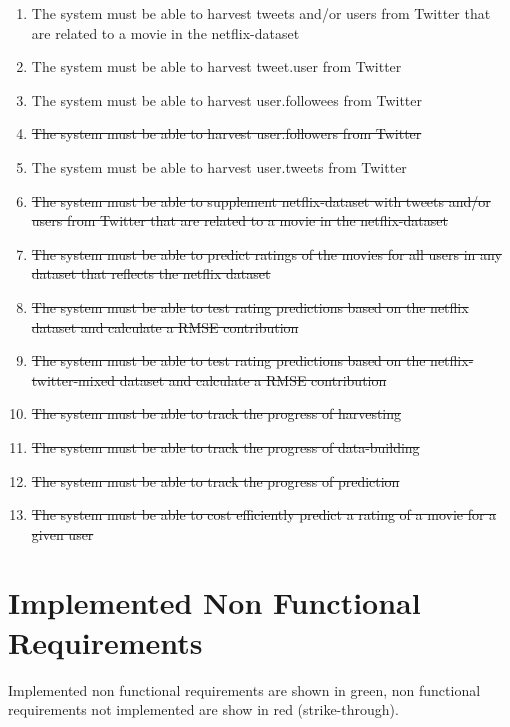 \begin{enumerate}[label=\bfseries FR \arabic*:]
  \item {\color{OliveGreen}The system must be able to harvest tweets and/or users from Twitter that are related to a movie in the netflix-dataset}
  \item {\color{OliveGreen}The system must be able to harvest tweet.user from Twitter}
  \item {\color{OliveGreen}The system must be able to harvest user.followees from Twitter}
  \item {\color{RedOrange}\st{The system must be able to harvest user.followers from Twitter}}
  \item {\color{OliveGreen}The system must be able to harvest user.tweets from Twitter}
  \item {\color{RedOrange}\st{The system must be able to supplement netflix-dataset with tweets and/or users from Twitter that are related to a movie in the netflix-dataset}}
  \item {\color{RedOrange}\st{The system must be able to predict ratings of the movies for all users in any dataset that reflects the netflix dataset}}
  \item {\color{RedOrange}\st{The system must be able to test rating predictions based on the netflix dataset and calculate a RMSE contribution}}
  \item {\color{RedOrange}\st{The system must be able to test rating predictions based on the netflix-twitter-mixed dataset and calculate a RMSE contribution}}
  \item {\color{RedOrange}\st{The system must be able to track the progress of harvesting}}
  \item {\color{RedOrange}\st{The system must be able to track the progress of data-building}}
  \item {\color{RedOrange}\st{The system must be able to track the progress of prediction}}
  \item {\color{RedOrange}\st{The system must be able to cost efficiently predict a rating of a movie for a given user}}
\end{enumerate}

\section{Implemented Non Functional Requirements}
Implemented non functional requirements are shown in green, non functional requirements not implemented are show in red (strike-through).


